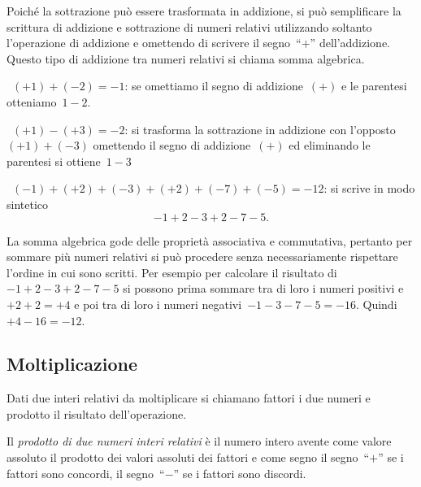 Poiché la sottrazione può essere trasformata in addizione, si può semplificare 
la scrittura di addizione
e sottrazione di numeri relativi utilizzando soltanto l'operazione di addizione 
e omettendo di scrivere
il segno~``\(+\)'' dell'addizione. Questo tipo di addizione tra numeri relativi si 
chiama somma algebrica.

\begin{exrig}
 \begin{esempio}
~\((+1)+(-2)=-1\): se omettiamo il segno di addizione~\((+)\) e le parentesi 
otteniamo~\(1-2\).
 \end{esempio}

\begin{esempio}
~\((+1)-(+3)=-2\): si trasforma la sottrazione in addizione con 
l'opposto~\((+1)+(-3)\) omettendo il segno
di addizione~\((+)\) ed eliminando le parentesi si ottiene~\(1-3\)
 \end{esempio}

\begin{esempio}
~\((-1)+(+2)+(-3)+(+2)+(-7)+(-5)=-12\): si scrive in modo sintetico 
\[-1+2-3+2-7-5.\]
 \end{esempio}

\end{exrig}

La somma algebrica gode delle proprietà associativa e commutativa, pertanto per 
sommare più numeri relativi
si può procedere senza necessariamente rispettare l'ordine in cui sono scritti. 
Per esempio per calcolare
il risultato di~\(-1+2-3+2-7-5\) si possono prima sommare tra di loro i numeri 
positivi e~\(+2+2=+4\)
e poi tra di loro i numeri negativi~\(-1-3-7-5=-16\). Quindi~\(+4-16=-12\).


\subsection{Moltiplicazione}

Dati due interi relativi da moltiplicare si chiamano fattori i due numeri e 
prodotto il
risultato dell'operazione.

Il \emph{prodotto di due numeri interi relativi} è il numero intero avente come 
valore assoluto il prodotto
dei valori assoluti dei fattori e come segno il segno~``\(+\)'' se i fattori sono 
concordi,
il segno~``\(-\)'' se i fattori sono discordi.

